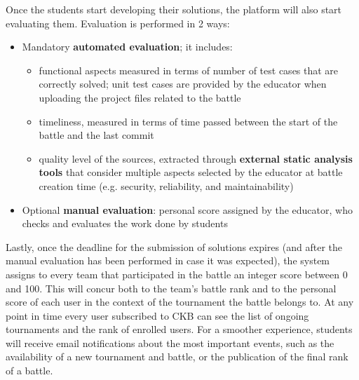 Once the students start developing their solutions, the platform will also start evaluating them. Evaluation is performed in 2 ways:
\begin{itemize}
    \item {Mandatory \textbf{automated evaluation}; it includes:}
    \begin{itemize}
        \item {functional aspects measured in terms of number of test cases that are correctly solved; unit test cases are provided by the educator when uploading the project files related to the battle}
        \item {timeliness, measured in terms of time passed between the start of the battle and the last commit}
        \item {quality level of the sources, extracted through  \textbf{external static analysis tools} that consider multiple aspects selected by the educator at battle creation time (e.g. security, reliability, and maintainability)}
    \end{itemize} 
    \item {Optional \textbf{manual evaluation}: personal score assigned by the educator, who checks and evaluates the work done by students}
\end{itemize}
Lastly, once the deadline for the submission of solutions expires (and after the manual evaluation has been performed in case it was expected), the system assigns to every team that participated in the battle an integer score between 0 and 100. This will concur both to the team's battle rank and to the personal score of each user in the context of the tournament the battle belongs to. At any point in time every user subscribed to CKB can see the list of ongoing tournaments and the rank of enrolled users.
For a smoother experience, students will receive email notifications about the most important events, such as the availability of a new tournament and battle, or the publication of the final rank of a battle.
